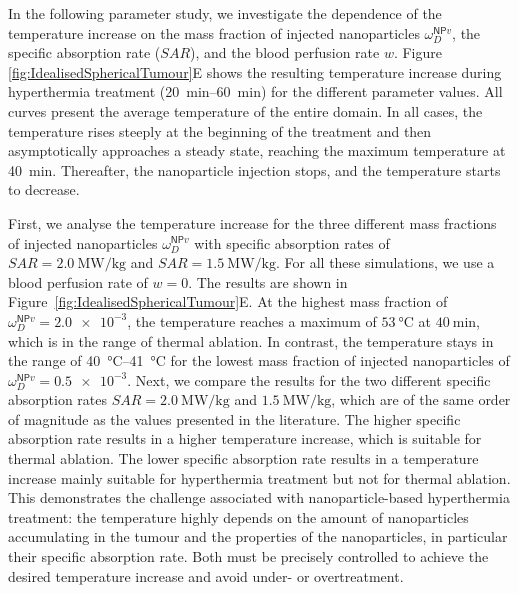 \documentclass[Times1COL,AMA]{WileyNJDv5} %
\newcommand{\omegaNPvD}{\omega^{\textsf{NP}v}_D}
\begin{document}
In the following parameter study, we investigate the dependence of the temperature increase on the mass fraction of injected nanoparticles $\omegaNPvD$, the specific absorption rate ($SAR$), and the blood perfusion rate $w$.
Figure \ref{fig:IdealisedSphericalTumour}E shows the resulting temperature increase during hyperthermia treatment (\SIrange{20}{60}{\minute}) for the different parameter values.
All curves present the average temperature of the entire domain.
In all cases, the temperature rises steeply at the beginning of the treatment and then asymptotically approaches a steady state, reaching the maximum temperature at \SI{40}{\minute}.
Thereafter, the nanoparticle injection stops, and the temperature starts to decrease.

First, we analyse the temperature increase for the three different mass fractions of injected nanoparticles $\omegaNPvD$ with specific absorption rates of $SAR = \SI{2.0}{\mega\watt\per\kilo\gram}$ and $SAR = \SI{1.5}{\mega\watt\per\kilo\gram}$.
For all these simulations, we use a blood perfusion rate of $w = 0$.
The results are shown in Figure~\ref{fig:IdealisedSphericalTumour}E.
At the highest mass fraction of $\omegaNPvD = \num{2.0e-3}$, the temperature reaches a maximum of $\SI{53}{\celsius}$ at $\SI{40}{\minute}$, which is in the range of thermal ablation.
In contrast, the temperature stays in the range of \SIrange{40}{41}{\celsius} for the lowest mass fraction of injected nanoparticles of $\omegaNPvD = \num{0.5e-3}$.
Next, we compare the results for the two different specific absorption rates $SAR = \SI{2.0}{\mega\watt\per\kilo\gram}$ and $\SI{1.5}{\mega\watt\per\kilo\gram}$, which are of the same order of magnitude as the values presented in the literature. \cite{Nabil2015}
The higher specific absorption rate results in a higher temperature increase, which is suitable for thermal ablation.
The lower specific absorption rate results in a temperature increase mainly suitable for hyperthermia treatment but not for thermal ablation.
This demonstrates the challenge associated with nanoparticle-based hyperthermia treatment:
the temperature highly depends on the amount of nanoparticles accumulating in the tumour and the properties of the nanoparticles, in particular their specific absorption rate.
Both must be precisely controlled to achieve the desired temperature increase and avoid under- or overtreatment.
\end{document}
